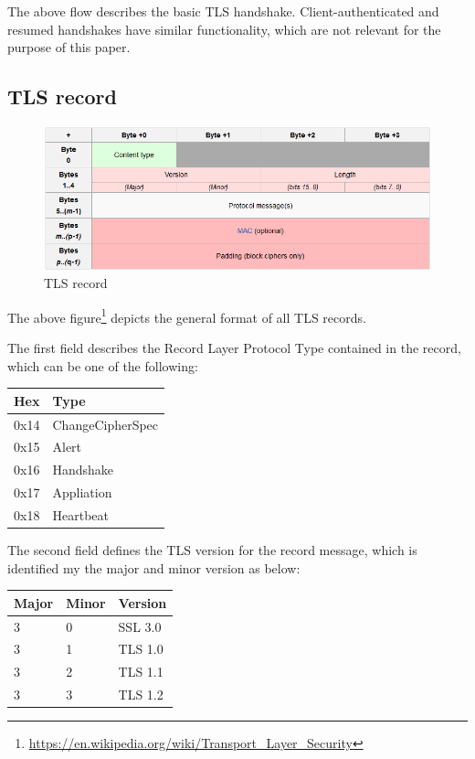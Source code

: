 The above flow describes the basic TLS handshake. Client-authenticated and
resumed handshakes have similar functionality, which are not relevant for the
purpose of this paper.

\subsection{TLS record}

\begin{figure}[H] \caption{TLS record} \centering
\includegraphics[width=1\textwidth]{diagrams/tls_record.png}\end{figure}

The above
figure\footnote{\url{https://en.wikipedia.org/wiki/Transport_Layer_Security}}
depicts the general format of all TLS records.

The first field describes the Record Layer Protocol Type contained in the
record, which can be one of the following:

\begin{table}[H] \centering \begin{tabular}{ | l | l | } \hline \textbf{Hex} &
\textbf{Type} \\ \hline 0x14 & ChangeCipherSpec \\ 0x15 & Alert \\ 0x16 &
Handshake \\ 0x17 & Appliation \\ 0x18 & Heartbeat \\ \hline \end{tabular}
\end{table}

The second field defines the TLS version for the record message, which is
identified my the major and minor version as below:

\begin{table}[H] \centering \begin{tabular}{ | l | l | l | } \hline
\textbf{Major} & \textbf{Minor} & \textbf{Version} \\ \hline 3 & 0 & SSL 3.0 \\
3 & 1 & TLS 1.0 \\ 3 & 2 & TLS 1.1 \\ 3 & 3 & TLS 1.2 \\ \hline \end{tabular}
\end{table}

